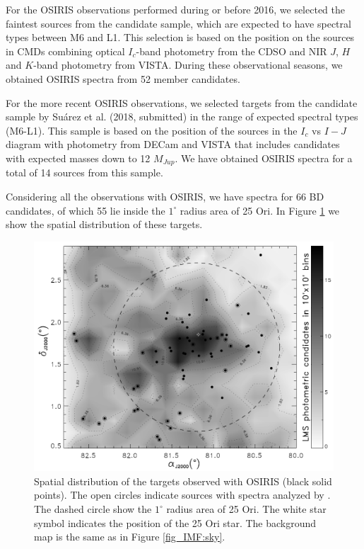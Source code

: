 \documentclass[12pt]{article}
\newcounter{subsubsubsection}[subsubsection]
\begin{document}
\label{sec_OSIRIS:targets}
For the OSIRIS observations performed during or before 2016, we selected the faintest sources from the \citet{Downes2014} candidate sample, which are expected to have spectral types between M6 and L1. This selection is based on the position on the sources in CMDs combining optical $I_c$-band photometry from the CDSO and NIR $J$, $H$ and $K$-band photometry from VISTA. During these observational seasons, we obtained OSIRIS spectra from 52 member candidates.

For the more recent OSIRIS observations, we selected targets from the candidate sample by Su\'arez et al. (2018, submitted) in the range of expected spectral types (M6-L1). This sample is based on the position of the sources in the $I_c$ vs $I-J$ diagram with photometry from DECam and VISTA that includes candidates with expected masses down to 12 $M_{Jup}$. We have obtained OSIRIS spectra for a total of 14 sources from this sample.%

Considering all the observations with OSIRIS, we have spectra for 66 BD candidates, of which 55 lie inside the $1^\circ$ radius area of 25 Ori. In Figure \ref{fig_OSIRIS:sky} we show the spatial distribution of these targets. 

\begin{figure}[ht!]
	\includegraphics[width=1.0\textwidth]{sky_OSIRIS.pdf}
	\caption[Spatial distribution of the OSIRIS targets.]{Spatial distribution of the targets observed with OSIRIS (black solid points). The open circles indicate sources with spectra analyzed by \citet{Downes2015}. The dashed circle show the $1^\circ$ radius area of 25 Ori. The white star symbol indicates the position of the 25 Ori star. The background map is the same as in Figure \ref{fig_IMF:sky}.}
	\label{fig_OSIRIS:sky}
\end{figure}
\end{document}
